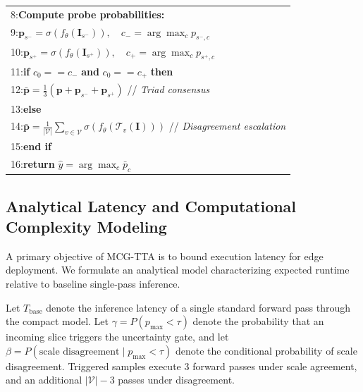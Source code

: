 \begin{table}[h]
\begin{tabular}{p{}}
8:\hspace{1em}\textbf{Compute probe probabilities:} \\
9:\hspace{2em}$\mathbf{p}_{s^-} = \sigma(f_\theta(\mathbf{I}_{s^-})), \quad c_- = \arg\max_c p_{s^-, c}$ \\
10:\hspace{1.5em}$\mathbf{p}_{s^+} = \sigma(f_\theta(\mathbf{I}_{s^+})), \quad c_+ = \arg\max_c p_{s^+, c}$ \\
11:\hspace{0.5em}\textbf{if} $c_0 == c_-$ \textbf{and} $c_0 == c_+$ \textbf{then} \\
12:\hspace{1.5em}$\bar{\mathbf{p}} = \frac{1}{3}(\mathbf{p} + \mathbf{p}_{s^-} + \mathbf{p}_{s^+})$ \hfill // \emph{Triad consensus} \\
13:\hspace{0.5em}\textbf{else} \\
14:\hspace{1.5em}$\bar{\mathbf{p}} = \frac{1}{|\mathcal{V}|} \sum_{v \in \mathcal{V}} \sigma(f_\theta(\mathcal{T}_v(\mathbf{I})))$ \hfill // \emph{Disagreement escalation} \\
15:\hspace{0.5em}\textbf{end if} \\
16:\hspace{0.5em}\textbf{return} $\hat{y} = \arg\max_c \bar{p}_c$ \\
\bottomrule
\end{tabular}
\label{alg:mcg_tta}
\end{table}

\subsection{Analytical Latency and Computational Complexity Modeling}

A primary objective of MCG-TTA is to bound execution latency for edge deployment. We formulate an analytical model characterizing expected runtime relative to baseline single-pass inference.

Let $T_{\text{base}}$ denote the inference latency of a single standard forward pass through the compact model. Let $\gamma = P(p_{\max} < \tau)$ denote the probability that an incoming slice triggers the uncertainty gate, and let $\beta = P(\text{scale disagreement} \mid p_{\max} < \tau)$ denote the conditional probability of scale disagreement. Triggered samples execute 3 forward passes under scale agreement, and an additional $|\mathcal{V}| - 3$ passes under disagreement.

